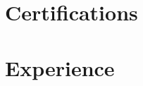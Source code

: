 \documentclass[]{deedy-resume}
\begin{document}
\begin{minipage}[t]{0.66\textwidth} 
  

\section{Certifications}



  
\section{Experience}











\end{minipage}
\end{document}
